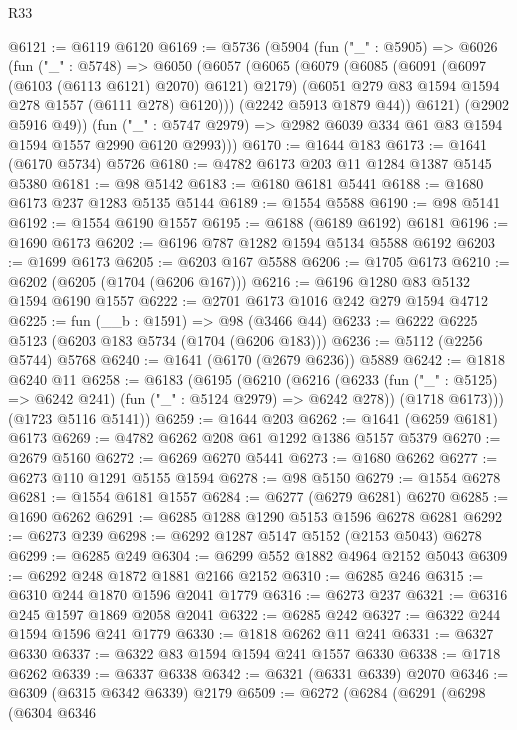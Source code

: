 \begin{lexlean}{R33}
\begin{coremodule}
@6121 := @6119 @6120
@6169 := @5736
    (@5904
      (fun ("_" : @5905) =>
      @6026
        (fun ("_" : @5748) =>
        @6050
          (@6057
            (@6065
              (@6079
                (@6085
                  (@6091 (@6097 (@6103 (@6113 @6121) @2070) @6121) @2179)
                  (@6051 @279 @83 @1594 @1594 @278 @1557 (@6111 @278) @6120)))
              (@2242 @5913 @1879 @44))
            @6121)
          (@2902 @5916 @49))
        (fun ("_" : @5747 @2979) => @2982 @6039 @334 @61 @83 @1594 @1594 @1557 @2990 @6120 @2993)))
@6170 := @1644 @183
@6173 := @1641 (@6170 @5734) @5726
@6180 := @4782 @6173 @203 @11 @1284 @1387 @5145 @5380
@6181 := @98 @5142
@6183 := @6180 @6181 @5441
@6188 := @1680 @6173 @237 @1283 @5135 @5144
@6189 := @1554 @5588
@6190 := @98 @5141
@6192 := @1554 @6190 @1557
@6195 := @6188 (@6189 @6192) @6181
@6196 := @1690 @6173
@6202 := @6196 @787 @1282 @1594 @5134 @5588 @6192
@6203 := @1699 @6173
@6205 := @6203 @167 @5588
@6206 := @1705 @6173
@6210 := @6202 (@6205 (@1704 (@6206 @167)))
@6216 := @6196 @1280 @83 @5132 @1594 @6190 @1557
@6222 := @2701 @6173 @1016 @242 @279 @1594 @4712
@6225 := fun (__b : @1591) => @98 (@3466 @44)
@6233 := @6222 @6225 @5123 (@6203 @183 @5734 (@1704 (@6206 @183)))
@6236 := @5112 (@2256 @5744) @5768
@6240 := @1641 (@6170 (@2679 @6236)) @5889
@6242 := @1818 @6240 @11
@6258 := @6183
    (@6195
      (@6210
        (@6216
          (@6233 (fun ("_" : @5125) => @6242 @241) (fun ("_" : @5124 @2979) => @6242 @278))
          (@1718 @6173)))
      (@1723 @5116 @5141))
@6259 := @1644 @203
@6262 := @1641 (@6259 @6181) @6173
@6269 := @4782 @6262 @208 @61 @1292 @1386 @5157 @5379
@6270 := @2679 @5160
@6272 := @6269 @6270 @5441
@6273 := @1680 @6262
@6277 := @6273 @110 @1291 @5155 @1594
@6278 := @98 @5150
@6279 := @1554 @6278
@6281 := @1554 @6181 @1557
@6284 := @6277 (@6279 @6281) @6270
@6285 := @1690 @6262
@6291 := @6285 @1288 @1290 @5153 @1596 @6278 @6281
@6292 := @6273 @239
@6298 := @6292 @1287 @5147 @5152 (@2153 @5043) @6278
@6299 := @6285 @249
@6304 := @6299 @552 @1882 @4964 @2152 @5043
@6309 := @6292 @248 @1872 @1881 @2166 @2152
@6310 := @6285 @246
@6315 := @6310 @244 @1870 @1596 @2041 @1779
@6316 := @6273 @237
@6321 := @6316 @245 @1597 @1869 @2058 @2041
@6322 := @6285 @242
@6327 := @6322 @244 @1594 @1596 @241 @1779
@6330 := @1818 @6262 @11 @241
@6331 := @6327 @6330
@6337 := @6322 @83 @1594 @1594 @241 @1557 @6330
@6338 := @1718 @6262
@6339 := @6337 @6338
@6342 := @6321 (@6331 @6339) @2070
@6346 := @6309 (@6315 @6342 @6339) @2179
@6509 := @6272
    (@6284
      (@6291
        (@6298
          (@6304
            @6346

\end{coremodule}
\end{lexlean}
